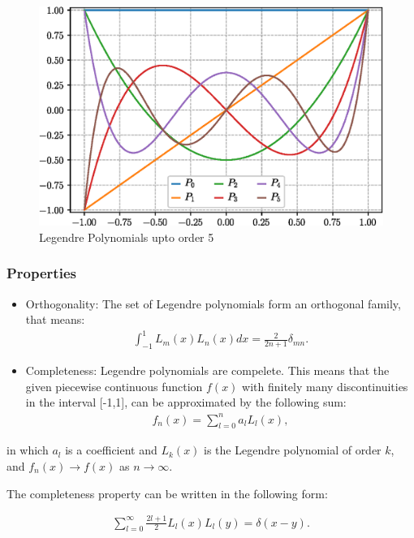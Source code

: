 \documentclass[
  a4paper,
  10pt]{article}
\begin{document}
\begin{figure}
\centering
\includegraphics{figs/44b1338c42c47641d4f196cdfa949fe403e8df20.eps}
\caption{Legendre Polynomials upto order 5}
\end{figure}

\hypertarget{properties}{%
\subsubsection{Properties}\label{properties}}

\begin{itemize}
\item
  Orthogonality: The set of Legendre polynomials form an orthogonal
  family, that means: \begin{align}
  \int_{-1}^1 L_m(x)L_n(x) dx = \frac{2}{2n+1}\delta_{mn}.
  \end{align}
\item
  Completeness: Legendre polynomials are compelete. This means that the
  given piecewise continuous function \(f(x)\) with finitely many
  discontinuities in the interval {[}-1,1{]}, can be approximated by the
  following sum: \begin{align}
  f_n(x)=\sum_{l=0}^{n}a_lL_l(x),
  \end{align}
\end{itemize}

in which \(a_l\) is a coefficient and \(L_k(x)\) is the Legendre
polynomial of order \(k\), and \(f_n(x) \to f(x)\) as \(n \to \infty\).

The completeness property can be written in the following form:

\begin{align}
\sum_{l=0}^{\infty}\frac{2l+1}{2}L_l(x)L_l(y) = \delta(x-y).
\end{align}
\end{document}
